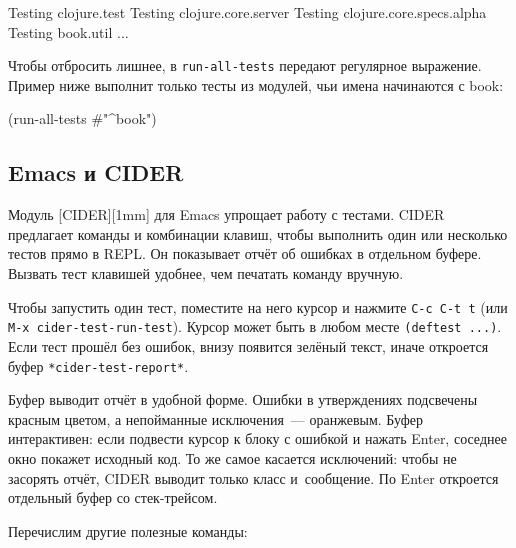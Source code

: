 \begin{english}
  \begin{text}
Testing clojure.test
Testing clojure.core.server
Testing clojure.core.specs.alpha
Testing book.util
...
  \end{text}
\end{english}


Чтобы отбросить лишнее, в \verb|run-all-tests| передают регулярное выражение.
Пример ниже выполнит только тесты из модулей, чьи имена начинаются с book:

\begin{english}
  \begin{clojure}
(run-all-tests #"^book")
  \end{clojure}
\end{english}

\subsection{Emacs и CIDER}


Модуль [CIDER][1mm] для
Emacs упрощает работу с тестами. CIDER предлагает команды и комбинации клавиш,
чтобы выполнить один или несколько тестов прямо в REPL. Он показывает отчёт об
ошибках в отдельном буфере. Вызвать тест клавишей удобнее, чем печатать команду
вручную.

Чтобы запустить один тест, поместите на него курсор и нажмите \verb|C-c C-t t|
(или \verb|M-x cider-test-run-test|). Курсор может быть в любом месте
\verb|(deftest ...)|. Если тест прошёл без ошибок, внизу появится зелёный
текст, иначе откроется буфер \verb|*cider-test-report*|.

Буфер выводит отчёт в удобной форме. Ошибки в утверждениях подсвечены красным
цветом, а непойманные исключения~--- оранжевым. Буфер интерактивен: если
подвести курсор к блоку с ошибкой и нажать Enter, соседнее окно покажет исходный
код. То же самое касается исключений: чтобы не засорять отчёт, CIDER выводит
только класс и~сообщение. По Enter откроется отдельный буфер со стек-трейсом.

Перечислим другие полезные команды:

